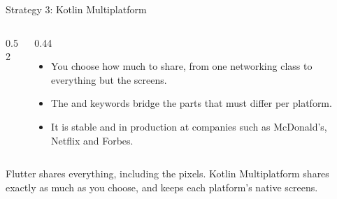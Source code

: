 \documentclass[10pt,aspectratio=169,t]{beamer}
\begin{document}
\begin{frame}[eyebrow=Strategies]{Strategy 3: Kotlin Multiplatform}
  \vskip 2mm
  \begin{columns}[T]
    \begin{column}{0.52\textwidth}
      \vskip 2.5mm
      \vskip 2.5mm
    \end{column}
    \begin{column}{0.44\textwidth}
      \begin{itemize}
        \item You choose how much to share, from one networking class to everything but the screens.
        \item The  and  keywords bridge the parts that must differ per platform.
        \item It is stable and in production at companies such as McDonald's, Netflix and Forbes.
      \end{itemize}
    \end{column}
  \end{columns}
  \begin{takeaway}{Flutter shares everything, including the pixels.}
    Kotlin Multiplatform shares exactly as much as you choose, and keeps each platform's native screens.
  \end{takeaway}
\end{frame}
\end{document}

